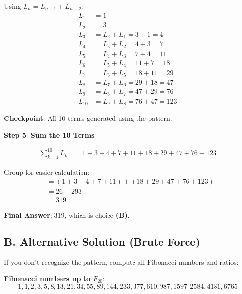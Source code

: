 \documentclass[12pt]{article}
\begin{document}
\begin{solutionbox}
Using $L_n = L_{n-1} + L_{n-2}$:
\begin{align*}
    L_1 &= 1 \\
    L_2 &= 3 \\
    L_3 &= L_2 + L_1 = 3 + 1 = 4 \\
    L_4 &= L_3 + L_2 = 4 + 3 = 7 \\
    L_5 &= L_4 + L_3 = 7 + 4 = 11 \\
    L_6 &= L_5 + L_4 = 11 + 7 = 18 \\
    L_7 &= L_6 + L_5 = 18 + 11 = 29 \\
    L_8 &= L_7 + L_6 = 29 + 18 = 47 \\
    L_9 &= L_8 + L_7 = 47 + 29 = 76 \\
    L_{10} &= L_9 + L_8 = 76 + 47 = 123
\end{align*}

\textbf{Checkpoint}: All 10 terms generated using the pattern.

\vspace{0.3cm}

\textbf{Step 5: Sum the 10 Terms}

\begin{align*}
    \sum_{k=1}^{10} L_k &= 1 + 3 + 4 + 7 + 11 + 18 + 29 + 47 + 76 + 123
\end{align*}

Group for easier calculation:
\begin{align*}
    &= (1 + 3 + 4 + 7 + 11) + (18 + 29 + 47 + 76 + 123) \\
    &= 26 + 293 \\
    &= 319
\end{align*}

\textbf{Final Answer}: 319, which is choice \textbf{(B)}.

\subsection*{B. Alternative Solution (Brute Force)}

If you don't recognize the pattern, compute all Fibonacci numbers and ratios:

\textbf{Fibonacci numbers up to $F_{20}$}:
$$1, 1, 2, 3, 5, 8, 13, 21, 34, 55, 89, 144, 233, 377, 610, 987, 1597, 2584, 4181, 6765$$


\end{solutionbox}
\end{document}
